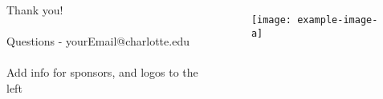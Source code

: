 \begin{frame}
\begin{columns}[T,onlytextwidth]
    \vspace{2em}
    \begin{center}
        \Large{
        Thank you!\\ \; \\
        
        Questions - yourEmail@charlotte.edu\\ \; \\
        
        Add info for sponsors, and logos to the left
        }
    \end{center}
    \begin{figure}
        \centering
        \texttt{[image: example-image-a]}
    \end{figure}
\end{columns}
\end{frame}